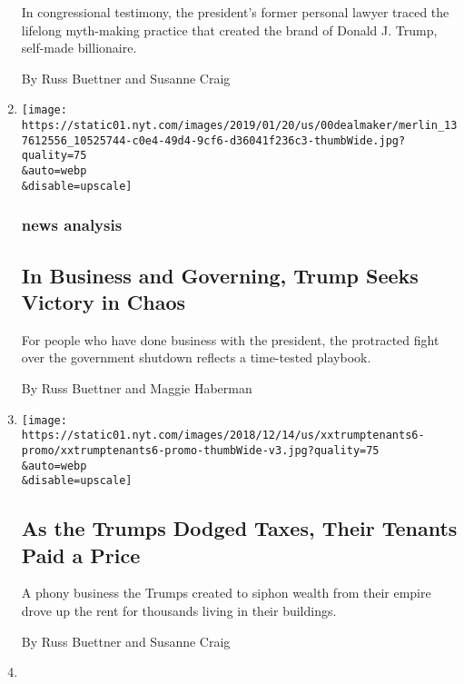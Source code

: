 \begin{enumerate}
  In congressional testimony, the president's former personal lawyer
  traced the lifelong myth-making practice that created the brand of
  Donald J. Trump, self-made billionaire.

  By Russ Buettner and Susanne Craig
\item
  \href{/2019/01/20/us/donald-trump-leadership-style.html}{}

  \texttt{[image: https://static01.nyt.com/images/2019/01/20/us/00dealmaker/merlin\_137612556\_10525744-c0e4-49d4-9cf6-d36041f236c3-thumbWide.jpg?quality=75\\\&auto=webp\\\&disable=upscale]}

  \hypertarget{news-analysis}{%
  \subsubsection{news analysis}\label{news-analysis}}

  \hypertarget{in-business-and-governing-trump-seeks-victory-in-chaos}{%
  \subsection{In Business and Governing, Trump Seeks Victory in
  Chaos}\label{in-business-and-governing-trump-seeks-victory-in-chaos}}

  For people who have done business with the president, the protracted
  fight over the government shutdown reflects a time-tested playbook.

  By Russ Buettner and Maggie Haberman
\item
  \href{/2018/12/15/us/politics/trump-tenants-taxes.html}{}

  \texttt{[image: https://static01.nyt.com/images/2018/12/14/us/xxtrumptenants6-promo/xxtrumptenants6-promo-thumbWide-v3.jpg?quality=75\\\&auto=webp\\\&disable=upscale]}

  \hypertarget{as-the-trumps-dodged-taxes-their-tenants-paid-a-price}{%
  \subsection{As the Trumps Dodged Taxes, Their Tenants Paid a
  Price}\label{as-the-trumps-dodged-taxes-their-tenants-paid-a-price}}

  A phony business the Trumps created to siphon wealth from their empire
  drove up the rent for thousands living in their buildings.

  By Russ Buettner and Susanne Craig
\item
  \href{/2018/10/04/us/politics/donald-trump-fred-trump-tax-schemes.html}{}


\end{enumerate}
